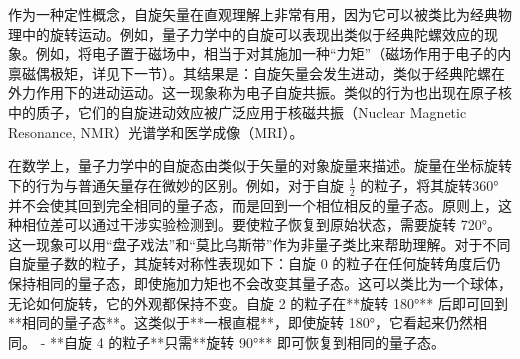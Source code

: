 作为一种定性概念，自旋矢量在直观理解上非常有用，因为它可以被类比为经典物理中的旋转运动。例如，量子力学中的自旋可以表现出类似于经典陀螺效应的现象。例如，将电子置于磁场中，相当于对其施加一种“力矩”（磁场作用于电子的内禀磁偶极矩，详见下一节）。其结果是：自旋矢量会发生进动，类似于经典陀螺在外力作用下的进动运动。这一现象称为电子自旋共振。类似的行为也出现在原子核中的质子，它们的自旋进动效应被广泛应用于核磁共振（Nuclear Magnetic Resonance, NMR）光谱学和医学成像（MRI）。

在数学上，量子力学中的自旋态由类似于矢量的对象旋量来描述。旋量在坐标旋转下的行为与普通矢量存在微妙的区别。例如，对于自旋 \( \frac{1}{2} \) 的粒子，将其旋转360° 并不会使其回到完全相同的量子态，而是回到一个相位相反的量子态。原则上，这种相位差可以通过干涉实验检测到。要使粒子恢复到原始状态，需要旋转 720°。这一现象可以用“盘子戏法”和“莫比乌斯带”作为非量子类比来帮助理解。对于不同自旋量子数的粒子，其旋转对称性表现如下：自旋 0 的粒子在任何旋转角度后仍保持相同的量子态，即使施加力矩也不会改变其量子态。这可以类比为一个球体，无论如何旋转，它的外观都保持不变。自旋 2 的粒子在**旋转 180°** 后即可回到**相同的量子态**。这类似于**一根直棍**，即使旋转 180°，它看起来仍然相同。  
- **自旋 4 的粒子**只需**旋转 90°** 即可恢复到相同的量子态。